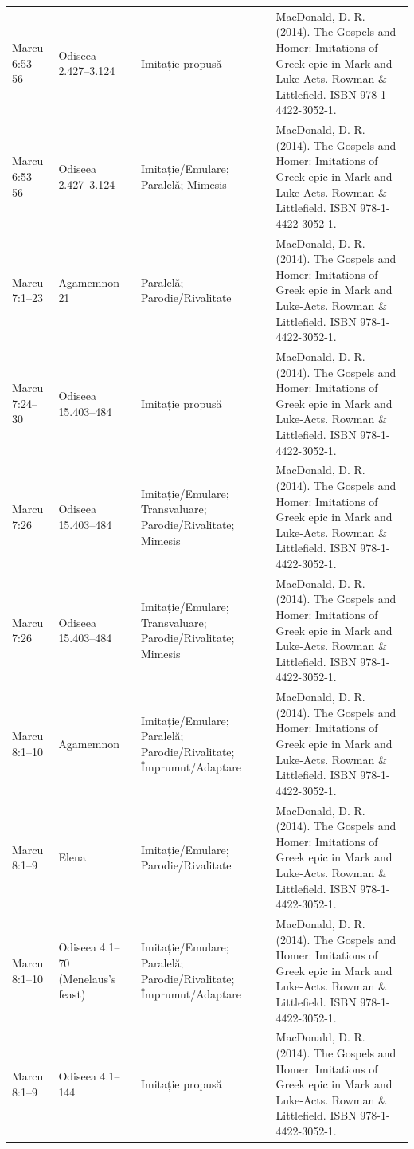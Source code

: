 \documentclass[12pt,a4paper,twoside,openany]{book}
\begin{document}
\begin{longtable}{L{1.4cm}L{1.7cm}L{3.1cm}L{8.4cm}}
Marcu 6:53–56 & Odiseea 2.427–3.124 & Imitație propusă & MacDonald, D. R. (2014). The Gospels and Homer: Imitations of Greek epic in Mark and Luke-Acts. Rowman \& Littlefield. ISBN 978-1-4422-3052-1. \\
Marcu 6:53–56 & Odiseea 2.427–3.124 & Imitație/Emulare; Paralelă; Mimesis & MacDonald, D. R. (2014). The Gospels and Homer: Imitations of Greek epic in Mark and Luke-Acts. Rowman \& Littlefield. ISBN 978-1-4422-3052-1. \\
Marcu 7:1–23 & Agamemnon 21 & Paralelă; Parodie/Rivalitate & MacDonald, D. R. (2014). The Gospels and Homer: Imitations of Greek epic in Mark and Luke-Acts. Rowman \& Littlefield. ISBN 978-1-4422-3052-1. \\
Marcu 7:24–30 & Odiseea 15.403–484 & Imitație propusă & MacDonald, D. R. (2014). The Gospels and Homer: Imitations of Greek epic in Mark and Luke-Acts. Rowman \& Littlefield. ISBN 978-1-4422-3052-1. \\
Marcu 7:26 & Odiseea 15.403–484 & Imitație/Emulare; Transvaluare; Parodie/Rivalitate; Mimesis & MacDonald, D. R. (2014). The Gospels and Homer: Imitations of Greek epic in Mark and Luke-Acts. Rowman \& Littlefield. ISBN 978-1-4422-3052-1. \\
Marcu 7:26 & Odiseea 15.403–484 & Imitație/Emulare; Transvaluare; Parodie/Rivalitate; Mimesis & MacDonald, D. R. (2014). The Gospels and Homer: Imitations of Greek epic in Mark and Luke-Acts. Rowman \& Littlefield. ISBN 978-1-4422-3052-1. \\
Marcu 8:1–10 & Agamemnon & Imitație/Emulare; Paralelă; Parodie/Rivalitate; Împrumut/Adaptare & MacDonald, D. R. (2014). The Gospels and Homer: Imitations of Greek epic in Mark and Luke-Acts. Rowman \& Littlefield. ISBN 978-1-4422-3052-1. \\
Marcu 8:1–9 & Elena & Imitație/Emulare; Parodie/Rivalitate & MacDonald, D. R. (2014). The Gospels and Homer: Imitations of Greek epic in Mark and Luke-Acts. Rowman \& Littlefield. ISBN 978-1-4422-3052-1. \\
Marcu 8:1–10 & Odiseea 4.1–70 (Menelaus’s feast) & Imitație/Emulare; Paralelă; Parodie/Rivalitate; Împrumut/Adaptare & MacDonald, D. R. (2014). The Gospels and Homer: Imitations of Greek epic in Mark and Luke-Acts. Rowman \& Littlefield. ISBN 978-1-4422-3052-1. \\
Marcu 8:1–9 & Odiseea 4.1–144 & Imitație propusă & MacDonald, D. R. (2014). The Gospels and Homer: Imitations of Greek epic in Mark and Luke-Acts. Rowman \& Littlefield. ISBN 978-1-4422-3052-1. \\

\end{longtable}
\end{document}
